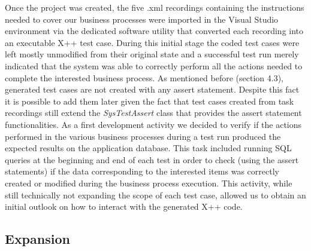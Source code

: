 Once the project was created, the five .xml recordings containing the instructions needed to cover our business processes were imported in the Visual Studio environment via the dedicated software utility that converted each recording into an executable X++ test case. During this initial stage the coded test cases were left mostly unmodified from their original state and a successful test run merely indicated that the system was able to correctly perform all the actions needed to complete the interested business process. As mentioned before (section 4.3), generated test cases are not created with any assert statement. Despite this fact it is possible to add them later given the fact that test cases created from task recordings still extend the \textit{SysTestAssert} class that provides the assert statement functionalities. As a first development activity we decided to verify if the actions performed in the various business processes during a test run produced the expected results on the application database. This task included running SQL queries at the beginning and end of each test in order to check (using the assert statements) if the data corresponding to the interested items was correctly created or modified during the business process execution. This activity, while still technically not expanding the scope of each test case, allowed us to obtain an initial outlook on how to interact with the generated X++ code.

\subsection{Expansion}

